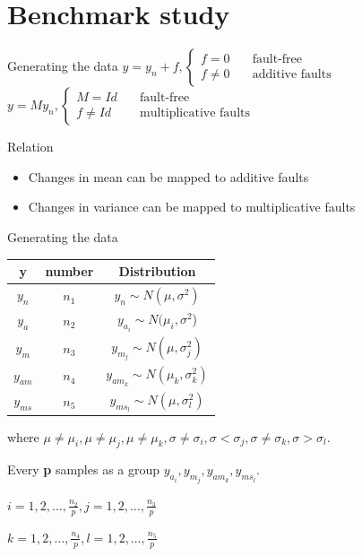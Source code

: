 \documentclass[10pt]{beamer}
\begin{document}
\section{Benchmark study}
\begin{frame}{Generating the data}
    $y = y_n + f, \left\{ \begin{aligned}
    f = 0      \quad &\text{fault-free} \\
    f \neq 0   \quad &\text{additive faults}
     \end{aligned} 
     \right. $
   $y = My_n,\left\{ \begin{aligned}
    M = Id     \quad &\text{fault-free} \\
    f \neq Id   \quad &\text{multiplicative faults}
     \end{aligned} 
     \right. $
      \begin{exampleblock}{Relation}
	\begin{itemize}
    \item Changes in mean can be mapped to additive faults
    \item Changes in variance can be mapped to multiplicative faults
    \end{itemize}
    \end{exampleblock}
    
\end{frame}
\begin{frame}{Generating the data}
\begin{center}
\begin{tabular}{ccc}
\hline
y& number& Distribution                                    \\
\hline
$y_n  $ &$n_1$& $y_n \sim N(\mu, \sigma^2)$                \\
$y_a  $ &$n_2$& $y_{a_i} \sim N(\mu_i,\sigma^2$)           \\
$y_m  $ &$n_3$& $y_{m_j} \sim N(\mu,\sigma_j^2)$           \\
$y_{am}$&$n_4$& $y_{am_k}\sim N(\mu_k,\sigma_k^2)$         \\
$y_{ms}$ &$n_5$& $y_{ms_l} \sim N(\mu,\sigma_l^2)$  \\
\hline
\end{tabular}
\end{center}
where $\mu \neq \mu_i,\mu \neq \mu_j,\mu \neq \mu_k,\sigma \neq \sigma_i,\sigma < \sigma_j,\sigma \neq \sigma_k,\sigma > \sigma_l$. \par Every \textbf{p} samples as a group
$y_{a_i},y_{m_j},y_{am_k},y_{ms_l}$. \par $i = 1,2,\dots,\frac{n_2}{p},j=1,2,\dots,\frac{n_3}{p}$ \par
$k = 1,2,\dots,\frac{n_4}{p},l = 1,2,\dots, \frac{n_5}{p}$
\end{frame}
\end{document}
